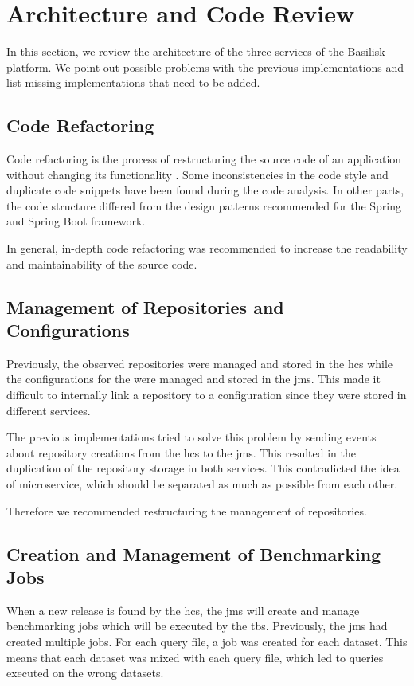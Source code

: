 \section{Architecture and Code Review}
\label{sec:architecture_review}
In this section, we review the architecture of the three services of the Basilisk platform.
We point out possible problems with the previous implementations and list missing implementations that need to be added.


\subsection{Code Refactoring}
\label{sec:code_refactor}
Code refactoring is the process of restructuring the source code of an application without changing its functionality \cite{fowlerRefactoringImprovingDesign2019a}.
Some inconsistencies in the code style and duplicate code snippets have been found during the code analysis.
In other parts, the code structure differed from the design patterns recommended for the Spring and Spring Boot framework.

In general, in-depth code refactoring was recommended to increase the readability and maintainability of the source code. 


\subsection{Management of Repositories and Configurations}
\label{sec:management_repo_config}
Previously, the observed repositories were managed and stored in the \ac{hcs} while the configurations for the \tsp{} were managed and stored in the \ac{jms}.
This made it difficult to internally link a repository to a \ts{} configuration since they were stored in different services.

The previous implementations tried to solve this problem by sending events about repository creations from the \ac{hcs} to the \ac{jms}.
This resulted in the duplication of the repository storage in both services.
This contradicted the idea of microservice, which should be separated as much as possible from each other.

Therefore we recommended restructuring the management of repositories.


\subsection{Creation and Management of Benchmarking Jobs}
\label{sec:creation_of_benchmark_jobs}
When a new release is found by the \ac{hcs}, the \acl{jms} will create and manage benchmarking jobs which will be executed by the \ac{tbs}.
Previously, the \ac{jms} had created multiple jobs.
For each query file, a job was created for each dataset.
This means that each dataset was mixed with each query file, which led to queries executed on the wrong datasets.

